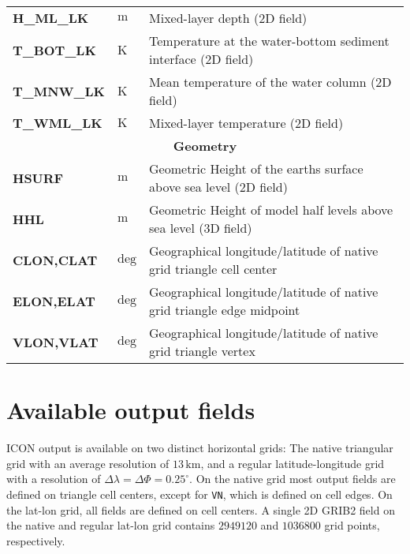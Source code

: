 \begin{longtable}{p{2.5cm}p{1.8cm}p{10.0cm}}
\textbf{H\_ML\_LK}                      &  $\mathrm{m}$               &  Mixed-layer depth (2D field)\\
\textbf{T\_BOT\_LK}                     &  $\mathrm{K}$               &  Temperature at the water-bottom sediment interface (2D field)\\
\textbf{T\_MNW\_LK}                     &  $\mathrm{K}$               &  Mean temperature of the water column (2D field)\\
\textbf{T\_WML\_LK}                     &  $\mathrm{K}$               &  Mixed-layer temperature (2D field)\\
\midrule
\multicolumn{3}{c}{\textbf{Geometry}}\\
\midrule
\textbf{HSURF}                          &  $\mathrm{m}$               &  Geometric Height of the earths surface above sea level (2D field) \\
\textbf{HHL}                            &  $\mathrm{m}$               &  Geometric Height of model half levels above sea level (3D field) \\
\textbf{CLON,CLAT}                      &  $\mathrm{deg}$             &  Geographical longitude/latitude of native grid triangle cell center \\
\textbf{ELON,ELAT}                      &  $\mathrm{deg}$             &  Geographical longitude/latitude of native grid triangle edge midpoint \\
\textbf{VLON,VLAT}                      &  $\mathrm{deg}$             &  Geographical longitude/latitude of native grid triangle vertex \\
  \bottomrule
\end{longtable}





\section{Available output fields}\label{sec_outfields}

ICON output is available on two distinct horizontal grids: The native triangular grid with an average resolution of $13\,\mathrm{km}$, 
and a regular latitude-longitude grid with a resolution of $\Delta \lambda = \Delta \Phi=0.25^{\circ}$. On the native grid most output 
fields are defined on triangle cell centers, except for \texttt{VN}, which is defined on cell edges. On the lat-lon grid, all fields are 
defined on cell centers. A single 2D GRIB2 field on the native and regular lat-lon grid contains $2949120$ and $1036800$ grid points, respectively.

